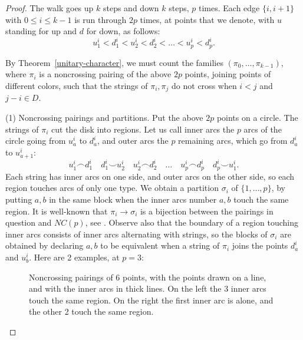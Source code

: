 \documentclass[11pt,a4paper]{article}
\begin{document}
\begin{proof}
The walk goes up $k$ steps and down $k$ steps, $p$ times. Each edge $\{i,i+1\}$ with $0\leq i\leq k-1$ is run through $2p$ times, at points that we denote, with $u$ standing for up and $d$ for down, as follows:
\[
 u_1^i<d_1^i<u_2^i<d_2^i<\ldots<u_p^i<d_p^i.
\]

By Theorem~\ref{unitary-character}, we must count the families $(\pi_0,\ldots,\pi_{k-1})$, where $\pi_i$ is a noncrossing pairing of the above $2p$ points, joining points of different colors, such that the strings of $\pi_i,\pi_j$ do not cross when $i<j$ and $j-i\in D$.

(1) Noncrossing pairings and partitions. Put the above $2p$ points on a circle. The strings of $\pi_i$ cut the disk into regions. Let us call inner arcs the $p$ arcs of the circle going from $u_a^i$ to $d_a^i$, and outer arcs the $p$ remaining arcs, which go from $d_a^i$ to $u_{a+1}^i$:
\[
 u_1^i\frown d_1^i\quad d_1^i\smile u_2^i\quad u_2^i\frown d_2^i\quad\ldots\quad u_p^i\frown d_p^i\quad d_p^i\smile u_1^i.
\]
 Each string has inner arcs on one side, and outer arcs on the other side, so each region touches arcs of only one type. We obtain a partition $\sigma_i$ of $\{1,\ldots,p\}$, by putting $a,b$ in the same block when the inner arcs number $a,b$ touch the same region. It is well-known that $\pi_i\to\sigma_i$ is a bijection between the pairings in question and $NC(p)$, see \cite{ns}. Observe also that the boundary of a region touching inner arcs consists of inner arcs alternating with strings, so the blocks of $\sigma_i$ are obtained by declaring $a,b$ to be equivalent when a string of $\pi_i$ joins the points $d_a^i$ and $u_b^i$. Here are 2 examples, at $p=3$:

\begin{figure}[H]\centering
{}
\caption{Noncrossing pairings of 6 points, with the points drawn on a line, and with the inner arcs in thick lines. On the left the 3 inner arcs touch the same region. On the right the first inner arc is alone, and the other 2 touch the same region.}
\label{inner-arcs}
\end{figure}


\end{proof}
\end{document}
